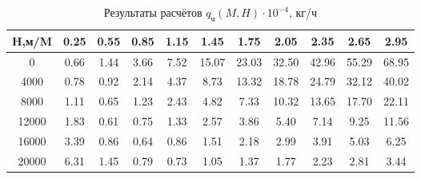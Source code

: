 \begin{table}[H]
\centering
\caption{Результаты расчётов $q_\text{ч}(M,H) \cdot 10^{-4}$, кг/ч}
\label{nx}
\begin{tabular}{|c|c|c|c|c|c|c|c|c|c|c|}
\toprule
H,м/M &  0.25 &  0.55 &  0.85 &  1.15 &   1.45 &   1.75 &   2.05 &   2.35 &   2.65 &   2.95 \\
\midrule
0     &  0.66 &  1.44 &  3.66 &  7.52 &  15.07 &  23.03 &  32.50 &  42.96 &  55.29 &  68.95 \\
4000  &  0.78 &  0.92 &  2.14 &  4.37 &   8.73 &  13.32 &  18.78 &  24.79 &  32.12 &  40.02 \\
8000  &  1.11 &  0.65 &  1.23 &  2.43 &   4.82 &   7.33 &  10.32 &  13.65 &  17.70 &  22.11 \\
12000 &  1.83 &  0.61 &  0.75 &  1.33 &   2.57 &   3.86 &   5.40 &   7.14 &   9.25 &  11.56 \\
16000 &  3.39 &  0.86 &  0.64 &  0.86 &   1.51 &   2.18 &   2.99 &   3.91 &   5.03 &   6.25 \\
20000 &  6.31 &  1.45 &  0.79 &  0.73 &   1.05 &   1.37 &   1.77 &   2.23 &   2.81 &   3.44 \\
\bottomrule
\end{tabular}
\end{table}
